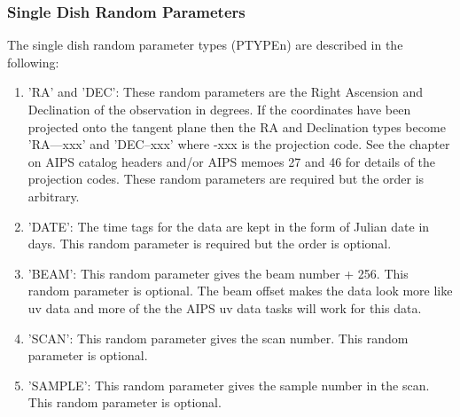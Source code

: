 \subsubsection{Single Dish Random Parameters }
The single dish random parameter types (PTYPEn)
are described in the following:
\begin{enumerate} %
\item 'RA' and 'DEC':  These random parameters are the Right
Ascension and Declination of the observation in degrees.  If the
coordinates have been projected onto the tangent plane then the RA and
Declination types become 'RA---xxx' and 'DEC--xxx' where -xxx is the
projection code.  See the chapter on AIPS catalog headers and/or
AIPS memoes 27 and 46 for details of the projection codes.  These
random parameters are required but the order is arbitrary.
\item 'DATE': The time tags for the data are kept in the form of Julian date
in days. This random parameter is required but the order is optional.
\item 'BEAM': This random parameter gives the beam number + 256. This random
parameter is optional.  The beam offset makes the data look more like
uv data and more of the the AIPS uv data tasks will work for this data.
\item 'SCAN': This random parameter gives the scan number. This random
parameter is optional.
\item 'SAMPLE': This random parameter gives the sample number in the scan.
This random parameter is optional.

\end{enumerate} %
